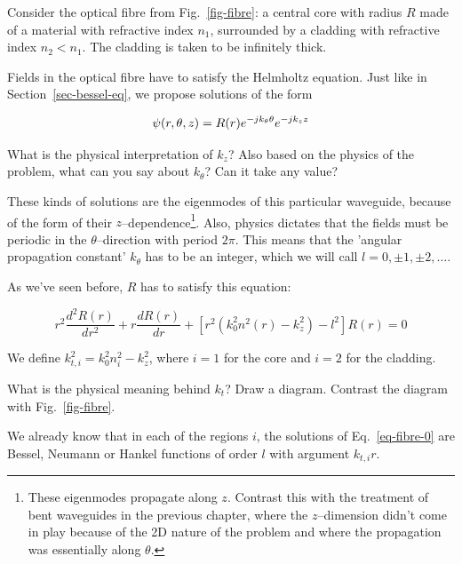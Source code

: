 Consider the optical fibre from Fig.~\ref{fig-fibre}: a central core with radius $R$ made of a material with refractive index $n_1$, surrounded by a cladding with refractive index $n_2 < n_1$. The cladding is taken to be infinitely thick. 

Fields in the optical fibre have to satisfy the Helmholtz equation. Just like in Section~\ref{sec-bessel-eq}, we propose solutions of the form 

\begin{equation}
\psi(r,\theta,z) = R(r)e^{-j k_\theta \theta }e^{-j k_z z} \\
\end{equation}

\begin{cue}
What is the physical interpretation of $k_z$? Also based on the physics of the problem, what can you say about $k_\theta $? Can it take any value?  
\end{cue}

These kinds of solutions are the eigenmodes of this particular waveguide, because of the form of their $z$--dependence\footnote{These eigenmodes propagate along $z$. Contrast this with the treatment of bent waveguides in the previous chapter, where the $z$--dimension didn't come in play because of the 2D nature of the problem and where the propagation was essentially along $\theta$.}.  Also, physics dictates that the fields must be periodic in the $\theta$--direction with period $2 \pi$. This means that the 'angular propagation constant' $k_\theta$ has to be an integer, which we will call $l = 0, \pm 1, \pm 2, \ldots$.

As we've seen before, $R$ has to satisfy this equation:

\begin{equation}
r^2\frac{d^2 R(r)}{d r^2} + r \frac{d R(r)}{d r} + \left[{r^2 \left(k_0^2 n^2(r) - k_z^2\right) - l^2}\right]R(r) = 0 \label{eq-fibre-0}
\end{equation} 

We define $k_{t,i}^2=k_0^2 n_i^2 - k_z^2$, where $i=1$ for the core and $i=2$ for the cladding.

\begin{exer}
What is the physical meaning behind $k_t$? Draw a diagram. Contrast the diagram with Fig.~\ref{fig-fibre}.
\end{exer}

We already know that in each of the regions $i$, the solutions of Eq.~\ref{eq-fibre-0} are Bessel, Neumann or Hankel functions of order $l$ with argument $k_{t,i} r$.

